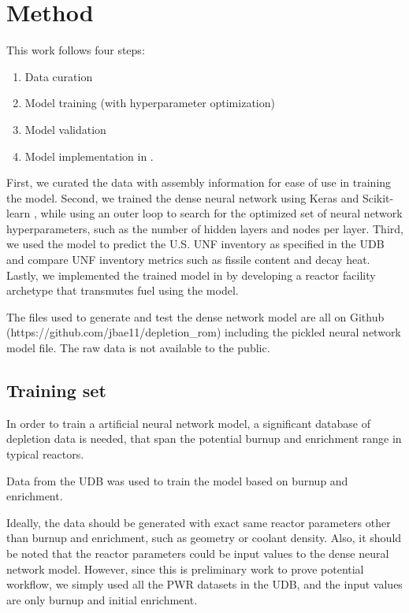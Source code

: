 \section{Method}

This work follows four steps:

\begin{enumerate}
\item Data curation
\item Model training (with hyperparameter optimization)
\item Model validation
\item Model implementation in \Cyclus.
\end{enumerate}


First, we curated the
data with assembly information for ease of use in training the model.
Second, we trained the dense neural network using Keras \cite{collet_keras_2015}
and Scikit-learn \cite{pedregosa_scikit-learn_2011},
while using an outer loop to
search for the optimized set of neural network hyperparameters,
such as the number of hidden layers and nodes per layer.
Third, we used the model to predict the U.S. \gls{UNF}
inventory as specified in the \gls{UDB} and compare
\gls{UNF} inventory metrics such as fissile content
and decay heat. Lastly, we implemented the trained
model in \Cyclus by developing a reactor facility archetype
that transmutes fuel using the model.

The files used to generate and test the dense network
model are all on Github (https://github.com/jbae11/depletion\_rom)
including the pickled neural network model file. The raw data
is not available to the public.

\subsection{Training set}

In order to train a artificial neural network model, a significant database of
depletion data is needed, that span the potential
burnup and enrichment range in typical reactors.

Data from the \gls{UDB} was used to train the model 
based on burnup and enrichment. 

Ideally, the data should be generated with exact same reactor
parameters other than burnup and enrichment, such as geometry or
coolant density. Also, it should be noted that the reactor
parameters could be input values to the dense neural network model. However, since
this is preliminary work to prove potential workflow, we
simply used all the \gls{PWR} datasets in the \gls{UDB},
and the input values are only burnup and initial enrichment.

